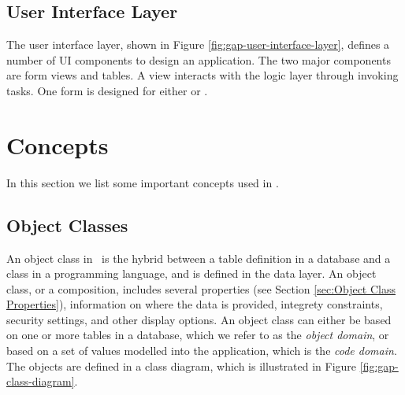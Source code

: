 
\subsection{User Interface Layer}
\label{sub:User Interface Layer}
The user interface layer, shown in Figure \ref{fig:gap-user-interface-layer}, defines a number of UI components to design an application. The two major components are form views and tables. A view interacts with the logic layer through invoking tasks. One form is designed for either  or .

\section{Concepts}
\label{sec:Concepts}
In this section we list some important concepts used in \gap.

\subsection{Object Classes}
\label{sub:Object Classes}
An object class in \gap~is the hybrid between a table definition in a database and a class in a programming language, and is defined in the data layer. An object class, or a composition, includes several properties (see Section \ref{sec:Object Class Properties}), information on where the data is provided, integrety constraints, security settings, and other display options. An object class can either be based on one or more tables in a database, which we refer to as the \textit{object domain}, or based on a set of values modelled into the application, which is the \textit{code domain}. The objects are defined in a class diagram, which is illustrated in Figure \ref{fig:gap-class-diagram}.

